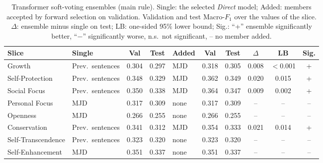 \begin{table}[!htbp]
\centering
\scriptsize
\caption{Transformer soft-voting ensembles (main rule). Single: the selected \emph{Direct} model; Added: members accepted by forward selection on validation. Validation and test Macro-$F_1$ over the values of the slice. $\Delta$: ensemble minus single on test; LB: one-sided 95\% lower bound; Sig.: ``+'' ensemble significantly better, ``$-$'' significantly worse, n.s.\ not significant, -- no member added.}
\label{tab:s8-ens}
\begin{tabularx}{\textwidth}{llccXccccc}
\hline
\textbf{Slice} & \textbf{Single} & \textbf{Val} & \textbf{Test} & \textbf{Added} & \textbf{Val} & \textbf{Test} & \textbf{$\Delta$} & \textbf{LB} & \textbf{Sig.} \\
\hline
Growth & Prev.\ sentences & 0.304 & 0.297 & MJD & 0.318 & 0.305 & 0.008 & $<$0.001 & + \\
Self-Protection & Prev.\ sentences & 0.348 & 0.329 & MJD & 0.362 & 0.349 & 0.020 & 0.015 & + \\
Social Focus & Prev.\ sentences & 0.350 & 0.338 & MJD & 0.364 & 0.347 & 0.009 & 0.002 & + \\
Personal Focus & MJD & 0.317 & 0.309 & none & 0.317 & 0.309 & -- & -- & -- \\
Openness & MJD & 0.266 & 0.255 & none & 0.266 & 0.255 & -- & -- & -- \\
Conservation & Prev.\ sentences & 0.341 & 0.312 & MJD & 0.354 & 0.333 & 0.021 & 0.014 & + \\
Self-Transcendence & Prev.\ sentences & 0.323 & 0.320 & none & 0.323 & 0.320 & -- & -- & -- \\
Self-Enhancement & MJD & 0.351 & 0.337 & none & 0.351 & 0.337 & -- & -- & -- \\
\hline
\end{tabularx}
\end{table}

